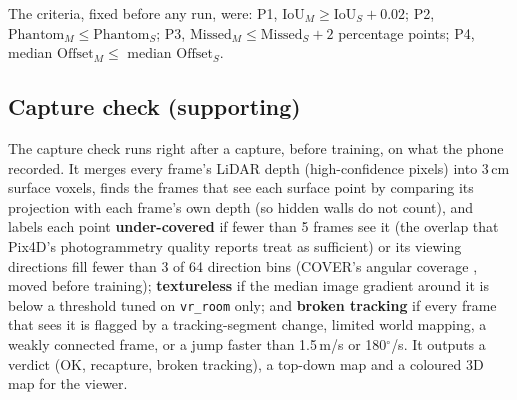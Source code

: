 The criteria, fixed before any run, were: P1, $\mathrm{IoU}_M \ge \mathrm{IoU}_S + 0.02$; P2, $\mathrm{Phantom}_M \le \mathrm{Phantom}_S$; P3, $\mathrm{Missed}_M \le \mathrm{Missed}_S + 2$ percentage points; P4, median $\mathrm{Offset}_M \le$ median $\mathrm{Offset}_S$.

\subsection{Capture check (supporting)}
\label{sec:capcheck-method}
The capture check runs right after a capture, before training, on what the phone recorded. It merges every frame's LiDAR depth (high-confidence pixels) into 3\,cm surface voxels, finds the frames that see each surface point by comparing its projection with each frame's own depth (so hidden walls do not count), and labels each point \textbf{under-covered} if fewer than 5 frames see it (the overlap that Pix4D's photogrammetry quality reports treat as sufficient) or its viewing directions fill fewer than 3 of 64 direction bins (COVER's angular coverage \cite{chen2026cover}, moved before training); \textbf{textureless} if the median image gradient around it is below a threshold tuned on \texttt{vr\_room} only; and \textbf{broken tracking} if every frame that sees it is flagged by a tracking-segment change, limited world mapping, a weakly connected frame, or a jump faster than 1.5\,m/s or 180$^\circ$/s. It outputs a verdict (OK, recapture, broken tracking), a top-down map and a coloured 3D map for the viewer.
